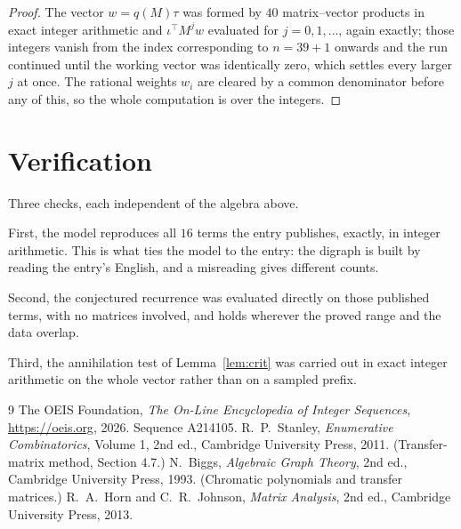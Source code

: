 \documentclass[11pt,a4paper]{article}
\theoremstyle{plain}
\theoremstyle{definition}
\begin{document}
\begin{proof}
The vector $w=q(M)\tau$ was formed by $40$ matrix--vector products in exact integer
arithmetic and $\iota^{\!\top}M^{j}w$ evaluated for $j=0,1,\dots$, again exactly; those
integers vanish from the index corresponding to $n=39+1$ onwards and the run continued
until the working vector was identically zero, which settles every larger $j$ at once. The
rational weights $w_i$ are cleared by a common denominator before any of this, so the whole
computation is over the integers.
\end{proof}

\section{Verification}

Three checks, each independent of the algebra above.

First, the model reproduces all $16$ terms the entry publishes, exactly, in integer
arithmetic. This is what ties the model to the entry: the digraph is built by reading the
entry's English, and a misreading gives different counts.

Second, the conjectured recurrence was evaluated directly on those published terms, with no
matrices involved, and holds wherever the proved range and the data overlap.

Third, the annihilation test of Lemma~\ref{lem:crit} was carried out in exact integer
arithmetic on the whole vector rather than on a sampled prefix.

\begin{thebibliography}{9}
 The OEIS Foundation, \emph{The On-Line Encyclopedia of Integer
Sequences}, \url{https://oeis.org}, 2026. Sequence A214105.
 R.~P.~Stanley, \emph{Enumerative Combinatorics}, Volume 1, 2nd ed.,
Cambridge University Press, 2011. (Transfer-matrix method, Section 4.7.)
 N.~Biggs, \emph{Algebraic Graph Theory}, 2nd ed., Cambridge University
Press, 1993. (Chromatic polynomials and transfer matrices.)
 R.~A.~Horn and C.~R.~Johnson, \emph{Matrix Analysis}, 2nd ed., Cambridge
University Press, 2013.
\end{thebibliography}
\end{document}

